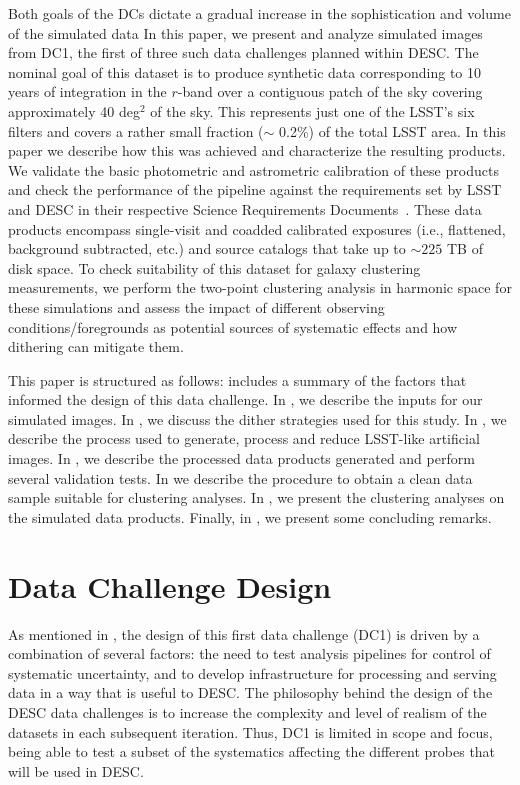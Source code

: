 \documentclass[twocolumn]{aastex62}
\begin{document}
Both goals of the DCs dictate a gradual increase in the
sophistication and volume of the simulated data In this paper, we
present and analyze simulated images from DC1, the first of three such
data challenges planned within DESC. The nominal goal of this dataset
is to produce synthetic data corresponding to 10 years of integration
in the $r$-band over a contiguous patch of the sky covering approximately 40 deg$^{2}$ of the
sky. This represents just one of the LSST's six filters and covers a rather 
small fraction ($\sim$ 0.2\%) of the total LSST area. In this paper we
describe how this was achieved and  characterize the resulting
products. We validate the basic photometric and astrometric
calibration of these products and check the performance of the
pipeline against the requirements set by LSST and DESC in their
respective Science Requirements Documents~\citep{LPM-17,
  2018arXiv180901669T}. These data products encompass single-visit and
coadded calibrated exposures (i.e., flattened, background subtracted,
etc.) and source catalogs that take up to $\sim 225$ TB of disk
space. To check suitability of this dataset for galaxy clustering
measurements, we perform the two-point clustering analysis in harmonic space for these simulations and assess the impact of different observing conditions/foregrounds as potential sources of systematic effects and how dithering can mitigate them. 

This paper is structured as follows:  includes a summary of the factors that informed
the design of this data challenge.  In , we describe the inputs for our simulated images. In , we discuss the dither strategies used for this study. In , we describe the process used to generate, process and reduce LSST-like artificial images. In , we describe the processed data products generated and perform several validation tests. In  we describe the procedure to obtain a clean data sample suitable for clustering analyses. In , we present the clustering analyses on the simulated data products. Finally, in , we present some concluding remarks.

\section{Data Challenge Design}
\label{sec:design}

As mentioned in , the design of this first data challenge (DC1) is driven by a
combination of several factors: the need to test analysis pipelines for control of systematic
uncertainty, and to develop infrastructure for processing and serving data in a way that is useful
to DESC. The philosophy behind the design of the DESC data challenges is to increase the complexity and level
of realism of the datasets in each subsequent iteration. Thus, DC1 is limited in scope and focus,
being able to test a subset of the systematics affecting the different probes that will be used in DESC.
\end{document}
